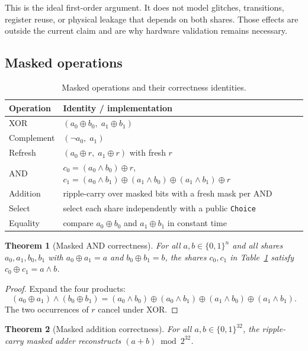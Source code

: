 \documentclass[11pt,a4paper]{article}
\newcommand{\bits}{\{0,1\}}
\newcommand{\code}[1]{\texttt{#1}}
\theoremstyle{plain}
\newtheorem{theorem}{Theorem}[section]
\theoremstyle{definition}
\theoremstyle{remark}
\begin{document}
This is the ideal first-order argument. It does not model glitches, transitions,
register reuse, or physical leakage that depends on both shares. Those effects are
outside the current claim and are why hardware validation remains necessary.

\subsection{Masked operations}

\begin{table}[htbp]
\centering
\caption{Masked operations and their correctness identities.}
\label{tab:masked-ops}
\begin{tabularx}{\linewidth}{@{}lX@{}}
\toprule
Operation & Identity / implementation \\
\midrule
XOR & \((a_0\oplus b_0,\;a_1\oplus b_1)\) \\
Complement & \((\neg a_0,\;a_1)\) \\
Refresh & \((a_0\oplus r,\;a_1\oplus r)\) with fresh \(r\) \\
AND & \(c_0=(a_0\wedge b_0)\oplus r\), \(c_1=(a_0\wedge b_1)\oplus(a_1\wedge b_0)\oplus(a_1\wedge b_1)\oplus r\) \\
Addition & ripple-carry over masked bits with a fresh mask per AND \\
Select & select each share independently with a public \code{Choice} \\
Equality & compare \(a_0\oplus b_0\) and \(a_1\oplus b_1\) in constant time \\
\bottomrule
\end{tabularx}
\end{table}

\begin{theorem}[Masked AND correctness]\label{thm:and}
For all \(a,b\in\bits^n\) and all shares \(a_0,a_1,b_0,b_1\) with
\(a_0\oplus a_1=a\) and \(b_0\oplus b_1=b\), the shares \(c_0,c_1\) in
Table~\ref{tab:masked-ops} satisfy \(c_0\oplus c_1=a\wedge b\).
\end{theorem}

\begin{proof}
Expand the four products:
\[
(a_0\oplus a_1)\wedge(b_0\oplus b_1)
= (a_0\wedge b_0)\oplus(a_0\wedge b_1)\oplus(a_1\wedge b_0)\oplus(a_1\wedge b_1).
\]
The two occurrences of \(r\) cancel under XOR.
\end{proof}

\begin{theorem}[Masked addition correctness]\label{thm:add}
For all \(a,b\in\bits^{32}\), the ripple-carry masked adder reconstructs
\((a+b)\bmod 2^{32}\).
\end{theorem}
\end{document}
